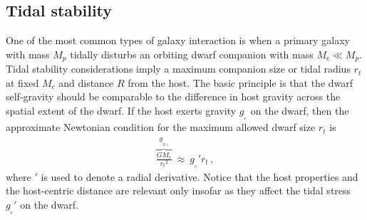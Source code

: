 \documentclass[fleqn,usenatbib,useAMS]{mnras} %
\begin{document}
\subsection{Tidal stability}
\label{Tidal_stability}

One of the most common types of galaxy interaction is when a primary galaxy with mass $M_p$ tidally disturbs an orbiting dwarf companion with mass $M_c \ll M_p$. Tidal stability considerations imply a maximum companion size or tidal radius $r_t$ at fixed $M_c$ and distance $R$ from the host. The basic principle is that the dwarf self-gravity should be comparable to the difference in host gravity across the spatial extent of the dwarf. If the host exerts gravity $g_{_e}$ on the dwarf, then the approximate Newtonian condition for the maximum allowed dwarf size $r_t$ is
\begin{eqnarray}
	\overbrace{\frac{GM_c}{{r_t}^2}}^{g_{_{N,i}}} ~\approx~ g_{_e}' r_t \, ,
	\label{r_tid_Newton}
\end{eqnarray}
where $'$ is used to denote a radial derivative. Notice that the host properties and the host-centric distance are relevant only insofar as they affect the tidal stress $g_{_e}'$ on the dwarf.
\end{document}
